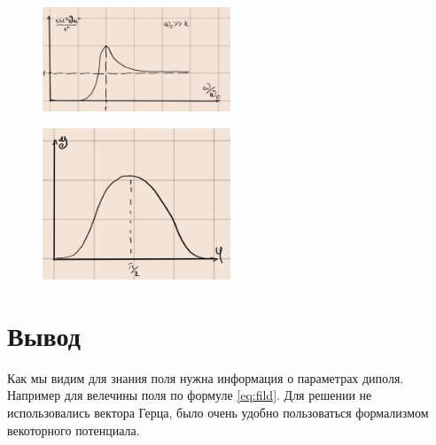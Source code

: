 \documentclass[a4paper]{article}
\numberwithin{equation}{section}
\begin{document}
\begin{figure}[h]
    \centering
    \includegraphics[trim={0 0 0 0},clip,width=0.5\textwidth]{omega.jpg}
    \label{pict}
\end{figure}
\begin{figure}[h]
    \centering
    \includegraphics[trim={0 0 0 0},clip,width=0.5\textwidth]{phi.jpg}
    \label{pict}
\end{figure}


\section{Вывод}

Как мы видим для знания поля нужна информация о параметрах диполя. 
Например для велечины поля по формуле \ref{eq:fild}. Для решении 
не использовались вектора Герца, было очень удобно пользоваться 
формализмом векоторного потенциала.
\end{document}
